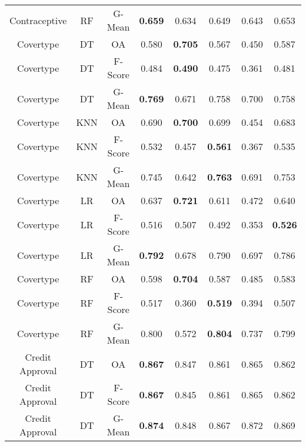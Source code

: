 \begin{longtable}{cccccccc}
  Contraceptive &         RF &  G-Mean & \textbf{0.659} &          0.634 &          0.649 &          0.643 &          0.653 \\
      Covertype &         DT &      OA &          0.580 & \textbf{0.705} &          0.567 &          0.450 &          0.587 \\
      Covertype &         DT & F-Score &          0.484 & \textbf{0.490} &          0.475 &          0.361 &          0.481 \\
      Covertype &         DT &  G-Mean & \textbf{0.769} &          0.671 &          0.758 &          0.700 &          0.758 \\
      Covertype &        KNN &      OA &          0.690 & \textbf{0.700} &          0.699 &          0.454 &          0.683 \\
      Covertype &        KNN & F-Score &          0.532 &          0.457 & \textbf{0.561} &          0.367 &          0.535 \\
      Covertype &        KNN &  G-Mean &          0.745 &          0.642 & \textbf{0.763} &          0.691 &          0.753 \\
      Covertype &         LR &      OA &          0.637 & \textbf{0.721} &          0.611 &          0.472 &          0.640 \\
      Covertype &         LR & F-Score &          0.516 &          0.507 &          0.492 &          0.353 & \textbf{0.526} \\
      Covertype &         LR &  G-Mean & \textbf{0.792} &          0.678 &          0.790 &          0.697 &          0.786 \\
      Covertype &         RF &      OA &          0.598 & \textbf{0.704} &          0.587 &          0.485 &          0.583 \\
      Covertype &         RF & F-Score &          0.517 &          0.360 & \textbf{0.519} &          0.394 &          0.507 \\
      Covertype &         RF &  G-Mean &          0.800 &          0.572 & \textbf{0.804} &          0.737 &          0.799 \\
Credit Approval &         DT &      OA & \textbf{0.867} &          0.847 &          0.861 &          0.865 &          0.862 \\
Credit Approval &         DT & F-Score & \textbf{0.867} &          0.845 &          0.861 &          0.865 &          0.862 \\
Credit Approval &         DT &  G-Mean & \textbf{0.874} &          0.848 &          0.867 &          0.872 &          0.869 \\

\end{longtable}
